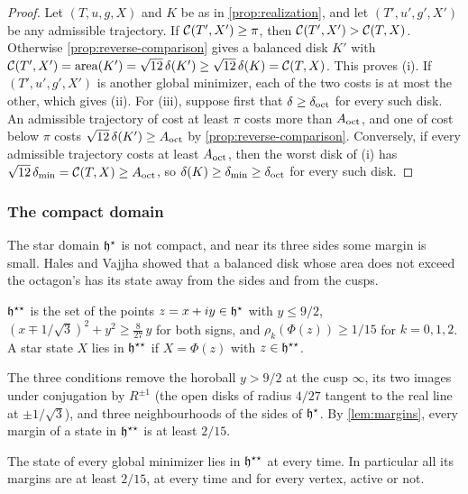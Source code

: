 \begin{proof}
Let $(T,u,g,X)$ and $K$ be as in \cref{prop:realization}, and let $(T',u',g',X')$ be any admissible
trajectory. If $\mathcal{C}(T',X')\ge\pi$, then $\mathcal{C}(T',X')>\mathcal{C}(T,X)$. Otherwise
\cref{prop:reverse-comparison} gives a balanced disk $K'$ with
$\mathcal{C}(T',X')=\operatorname{area}(K')=\sqrt{12}\,\delta(K')\ge\sqrt{12}\,\delta(K)=\mathcal{C}(T,X)$. This proves (i).
If $(T',u',g',X')$ is another global minimizer, each of the two costs is at most the other, which
gives (ii). For (iii), suppose first that $\delta\ge\delta_{\mathrm{oct}}$ for every such disk. An admissible
trajectory of cost at least $\pi$ costs more than $A_{\mathrm{oct}}$, and one of cost below $\pi$ costs
$\sqrt{12}\,\delta(K')\ge A_{\mathrm{oct}}$ by \cref{prop:reverse-comparison}. Conversely, if every admissible
trajectory costs at least $A_{\mathrm{oct}}$, then the worst disk of (i) has
$\sqrt{12}\,\delta_{\min}=\mathcal{C}(T,X)\ge A_{\mathrm{oct}}$, so $\delta(K)\ge\delta_{\min}\ge\delta_{\mathrm{oct}}$ for every such
disk.
\end{proof}

\subsubsection{The compact domain}\label{sec:set-compact}

The star domain $\mathfrak{h}^{\star}$ is not compact, and near its three sides some margin is small. Hales and
Vajjha showed that a balanced disk whose area does not exceed the octagon's has its state away
from the sides and from the cusps.

\begin{definition}\label{def:compact-domain}
$\mathfrak{h}^{\star\star}$ is the set of the points $z=x+iy\in\mathfrak{h}^{\star}$ with $y\le9/2$,
$(x\mp1/\sqrt3)^2+y^2\ge\tfrac{8}{27}\,y$ for both signs, and $\rho_k(\Phi(z))\ge1/15$ for
$k=0,1,2$. A star state $X$ lies in $\mathfrak{h}^{\star\star}$ if $X=\Phi(z)$ with $z\in\mathfrak{h}^{\star\star}$.
\end{definition}

The three conditions remove the horoball $y>9/2$ at the cusp $\infty$, its two images under
conjugation by $R^{\pm1}$ (the open disks of radius $4/27$ tangent to the real line at
$\pm1/\sqrt3$), and three neighbourhoods of the sides of $\mathfrak{h}^{\star}$. By \cref{lem:margins}, every
margin of a state in $\mathfrak{h}^{\star\star}$ is at least $2/15$.

\begin{theorem}\label{thm:compact-domain}
The state of every global minimizer lies in $\mathfrak{h}^{\star\star}$ at every time. In particular all its
margins are at least $2/15$, at every time and for every vertex, active or not.
\end{theorem}

